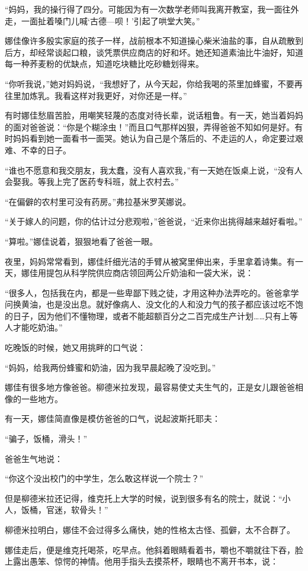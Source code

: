 “妈妈，我的操行得了四分。可能因为有一次数学老师叫我离开教室，我一面往外走，一面扯着嗓门儿喊‘古德—呗！’引起了哄堂大笑。”

娜佳像许多殷实家庭的孩子一样，战前根本不知道操心柴米油盐的事，自从疏散到后方，却经常谈起口粮，谈凭票供应商店的好和坏。她还知道素油比牛油好，知道每一种荞麦粉的优缺点，知道吃块糖比吃砂糖划得来。

“你听我说，”她对妈妈说，“我想好了，从今天起，你给我喝的茶里加蜂蜜，不要再往里加炼乳。我看这样对我更好，对你还是一样。”

有时娜佳愁眉苦脸，用嘲笑轻蔑的态度对待长辈，说话粗鲁。有一天，她当着妈妈的面对爸爸说：“你是个糊涂虫！”而且口气那样凶狠，弄得爸爸不知如何是好。有时妈妈看到她一面看书一面哭。她认为自己是个落后的、不走运的人，命定要过艰难、不幸的日子。

“谁也不愿意和我交朋友，我太蠢，没有人喜欢我，”有一天她在饭桌上说，“没有人会娶我。等我上完了医药专科班，就上农村去。”

“在偏僻的农村里可没有药房。”弗拉基米罗芙娜说。

“关于嫁人的问题，你的估计过分悲观啦，”爸爸说，“近来你出挑得越来越好看啦。”

“算啦。”娜佳说着，狠狠地看了爸爸一眼。

夜里，妈妈常常看到，娜佳纤细光洁的手臂从被窝里伸出来，手里拿着诗集。有一天，娜佳用提包从科学院供应商店领回两公斤奶油和一袋大米，说：

“很多人，包括我在内，都是一些卑鄙下贱之徒，才用这种办法弄吃的。爸爸拿学问换黄油，也是没出息。就好像病人、没文化的人和没力气的孩子都应该过吃不饱的日子，因为他们不懂物理，或者不能超额百分之二百完成生产计划……只有上等人才能吃奶油。”

吃晚饭的时候，她又用挑畔的口气说：

“妈妈，给我两份蜂蜜和奶油，因为我早晨起晚了没吃到。”

娜佳有很多地方像爸爸。柳德米拉发现，最容易使丈夫生气的，正是女儿跟爸爸相像的一些地方。

有一天，娜佳简直像是模仿爸爸的口气，说起波斯托耶夫：

“骗子，饭桶，滑头！”

爸爸生气地说：

“你这个没出校门的中学生，怎么敢这样说一个院士？”

但是柳德米拉还记得，维克托上大学的时候，说到很多有名的院士，就说：“小人，饭桶，官迷，软骨头！”

柳德米拉明白，娜佳不会过得多么痛快，她的性格太古怪、孤僻，太不合群了。

娜佳走后，便是维克托喝茶，吃早点。他斜着眼睛看着书，嚼也不嚼就往下吞，脸上露出愚笨、惊愕的神情。他用手指头去摸茶杯，眼睛也不离开书本，说：

